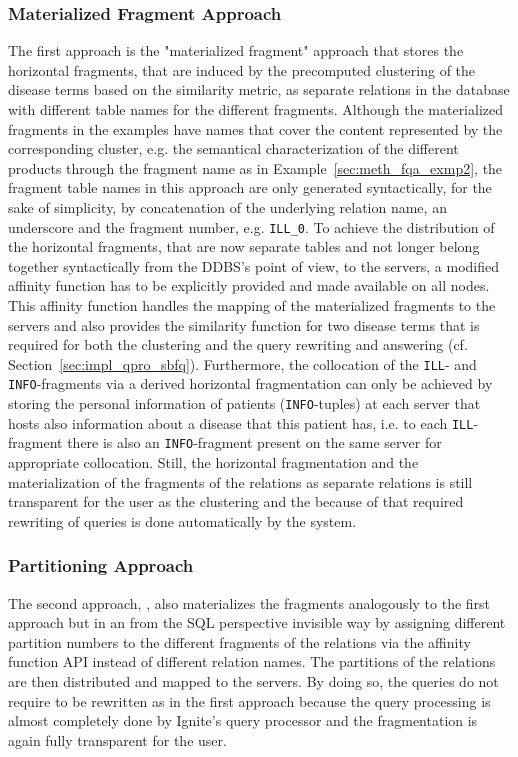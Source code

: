 \subsubsection{Materialized Fragment Approach}
\label{sec:impl_alter_mater}
The first approach is the "materialized fragment" approach that stores the horizontal fragments, that are induced by the precomputed clustering of the disease
terms based on the similarity metric, as separate relations in the database with different table names for the different fragments. Although the materialized
fragments in the examples have names that cover the content represented by the corresponding cluster, e.g. the semantical characterization of the different
products through the fragment name as in Example~\ref{sec:meth_fqa_exmp2}, the fragment table names in this approach are only generated syntactically, for the
sake of simplicity, by concatenation of the underlying relation name, an underscore and the fragment number, e.g. \verb!ILL_0!. To achieve the distribution of
the horizontal fragments, that are now separate tables and not longer belong together syntactically from the DDBS's point of view, to the servers, a modified
affinity function has to be explicitly provided and made available on all nodes. This affinity function handles the mapping of the materialized fragments to 
the servers and also provides the similarity function for two disease terms that is required for both the clustering and the query rewriting and answering 
(cf. Section~\ref{sec:impl_qpro_sbfq}). Furthermore, the collocation of the \verb!ILL!- and \verb!INFO!-fragments via a derived horizontal fragmentation can
only be achieved by storing the personal information of patients (\verb!INFO!-tuples) at each server that hosts also information about a disease that this
patient has, i.e. to each \verb!ILL!-fragment there is also an \verb!INFO!-fragment present on the same server for appropriate collocation. Still, the
horizontal fragmentation and the materialization of the fragments of the relations as separate relations is still transparent for the user as the clustering 
and the because of that required rewriting of queries is done automatically by the system.


\subsubsection{Partitioning Approach}

The second approach, \dotsi, also materializes the fragments analogously to the first approach but in an from the SQL perspective invisible way by assigning
different partition numbers to the different fragments of the relations via the affinity function API instead of different relation names. The partitions of 
the relations are then distributed and mapped to the servers. By doing so, the queries do not require to be rewritten as in the first approach because the 
query processing is almost completely done by Ignite's query processor and the fragmentation is again fully transparent for the user.



